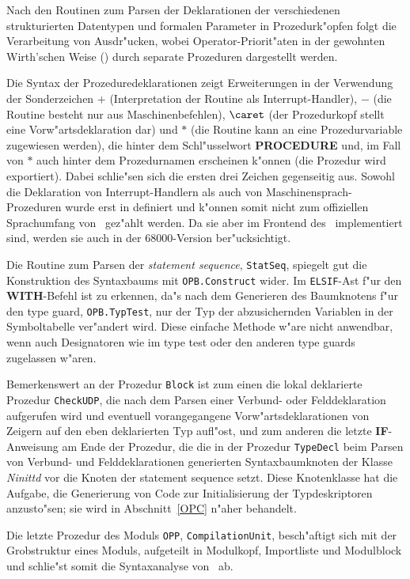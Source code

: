Nach den Routinen zum Parsen der Deklarationen der verschiedenen strukturierten
Datentypen und formalen Parameter in Prozedurk"opfen folgt die Verarbeitung
von Ausdr"ucken, wobei Operator-Priorit"aten in der gewohnten Wirth'schen
Weise (\cite{compilerBau}) durch separate Prozeduren dargestellt werden.

Die Syntax der Prozeduredeklarationen zeigt Erweiterungen in der Verwendung
der Sonderzeichen $+$ (Interpretation der Routine als Interrupt-Handler),
$-$ (die Routine besteht nur aus Maschinenbefehlen), $\caret$ (der Prozedurkopf stellt
eine Vorw"artsdeklaration dar) und $\ast$ (die Routine kann
an eine Prozedurvariable zugewiesen werden), die hinter dem Schl"usselwort
{\bf PROCEDURE} und, im Fall von $\ast$ auch hinter dem Prozedurnamen erscheinen
k"onnen (die Prozedur wird exportiert). Dabei schlie"sen sich die ersten drei
Zeichen gegenseitig aus.
Sowohl die Deklaration von Interrupt-Handlern als auch von Maschinensprach-Prozeduren
wurde erst in \cite[S.~38]{op2doc} definiert und k"onnen somit nicht zum
offiziellen Sprachumfang von \oberon\ gez"ahlt werden.
Da sie aber im Frontend des \OP\ implementiert sind, werden sie auch in der
68000-Version ber"ucksichtigt.

Die Routine zum Parsen der {\it statement sequence\/}, {\tt StatSeq}, spiegelt
gut die Konstruktion des Syntaxbaums mit {\tt OPB.Construct} wider.
Im {\tt ELSIF}-Ast f"ur den {\bf WITH}-Befehl ist zu erkennen, da"s nach dem
Generieren des Baumknotens f"ur den type guard, {\tt OPB.TypTest}, nur der
Typ der abzusichernden Variablen in der Symboltabelle ver"andert wird.
Diese einfache Methode w"are nicht anwendbar, wenn auch Designatoren wie im
type test oder den anderen type guards zugelassen w"aren.

Bemerkenswert an der Prozedur {\tt Block} ist zum einen die lokal deklarierte
Prozedur {\tt CheckUDP}, die nach dem Parsen einer Verbund- oder Felddeklaration
aufgerufen wird und eventuell vorangegangene Vorw"artsdeklarationen von
Zeigern auf den eben deklarierten Typ aufl"ost, und zum anderen die letzte
{\bf IF}-Anweisung am Ende der Prozedur, die die in der Prozedur {\tt TypeDecl}
beim Parsen von Verbund- und Felddeklarationen generierten Syntaxbaumknoten der
Klasse {\it Ninittd} vor die Knoten der statement sequence setzt. Diese Knotenklasse
hat die Aufgabe, die Generierung von Code zur Initialisierung der Typdeskriptoren
anzusto"sen; sie wird in Abschnitt~\ref{OPC} n"aher behandelt.

Die letzte Prozedur des Moduls {\tt OPP}, {\tt CompilationUnit}, besch"aftigt
sich mit der Grobstruktur eines Moduls, aufgeteilt in Modulkopf, Importliste und
Modulblock und schlie"st somit die Syntax\-analyse von \oberon\ ab.

